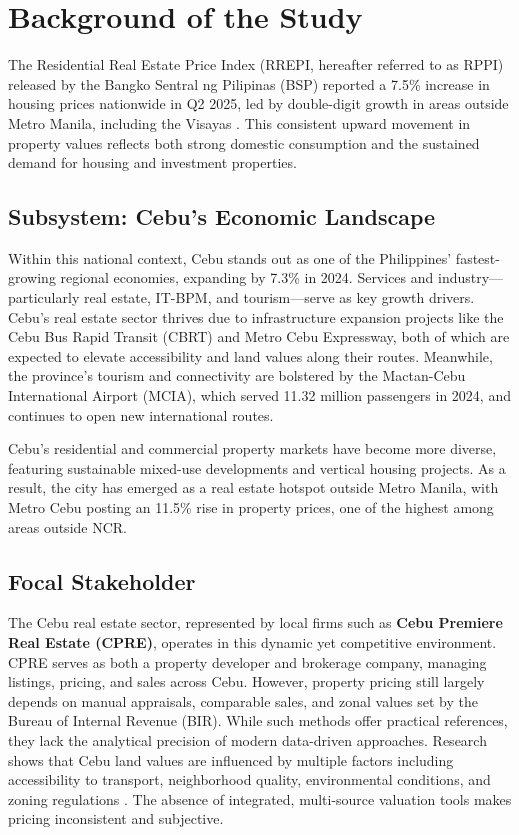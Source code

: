 \section{Background of the Study}

The Residential Real Estate Price Index (RREPI, hereafter referred to as RPPI) released by the Bangko Sentral ng Pilipinas (BSP) reported a 7.5\% increase in housing prices nationwide in Q2 2025, led by double-digit growth in areas outside Metro Manila, including the Visayas \parencite{bsp2025}. This consistent upward movement in property values reflects both strong domestic consumption and the sustained demand for housing and investment properties.

\subsection{Subsystem: Cebu's Economic Landscape}

Within this national context, Cebu stands out as one of the Philippines’ fastest-growing regional economies, expanding by 7.3\% in 2024. Services and industry—particularly real estate, IT-BPM, and tourism—serve as key growth drivers. Cebu’s real estate sector thrives due to infrastructure expansion projects like the Cebu Bus Rapid Transit (CBRT) and Metro Cebu Expressway, both of which are expected to elevate accessibility and land values along their routes. Meanwhile, the province’s tourism and connectivity are bolstered by the Mactan-Cebu International Airport (MCIA), which served 11.32 million passengers in 2024, and continues to open new international routes.

Cebu’s residential and commercial property markets have become more diverse, featuring sustainable mixed-use developments and vertical housing projects. As a result, the city has emerged as a real estate hotspot outside Metro Manila, with Metro Cebu posting an 11.5\% rise in property prices, one of the highest among areas outside NCR.

\subsection{Focal Stakeholder}

The Cebu real estate sector, represented by local firms such as \textbf{Cebu Premiere Real Estate (CPRE)}, operates in this dynamic yet competitive environment. CPRE serves as both a property developer and brokerage company, managing listings, pricing, and sales across Cebu. However, property pricing still largely depends on manual appraisals, comparable sales, and zonal values set by the Bureau of Internal Revenue (BIR). While such methods offer practical references, they lack the analytical precision of modern data-driven approaches. Research shows that Cebu land values are influenced by multiple factors including accessibility to transport, neighborhood quality, environmental conditions, and zoning regulations \parencite{agosto2017}. The absence of integrated, multi-source valuation tools makes pricing inconsistent and subjective.

